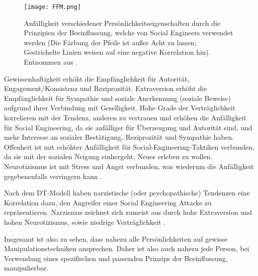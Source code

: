 \begin{figure}[!htp]
    \centering
    \texttt{[image: FFM.png]}
    \caption{Anfälligkeit verschiedener Persönlichkeitseigenschaften durch die Prinzipien der Beeinflussung, welche von Social Engineers verwendet werden (Die Färbung der Pfeile ist außer Acht zu lassen; Gestrichelte Linien weisen auf eine negative Korrelation hin). Entnommen aus .}
\end{figure}
\FloatBarrier

Gewissenhaftigkeit erhöht die Empfänglichkeit für Autorität, Engagement/Konsistenz und Reziprozität.
Extraversion erhöht die Empfänglichkeit für Sympathie und soziale Anerkennung (soziale Beweise) aufgrund ihrer Verbindung mit Geselligkeit.
Hohe Grade der Verträglichkeit korrelieren mit der Tendenz, anderen zu vertrauen und erhöhen die Anfälligkeit für Social Engineering, da sie anfälliger für Überzeugung und Autorität sind,
und mehr Interesse an sozialer Bestätigung, Reziprozität und Sympathie haben.
Offenheit ist mit erhöhter Anfälligkeit für Social-Engineering-Taktiken verbunden, da sie mit der sozialen Neigung einhergeht, Neues erleben zu wollen.
Neurotizismus ist mit Stress und Angst verbunden, was wiederum die Anfälligkeit gegebenenfalls verringern kann .

Nach dem DT-Modell haben narzistische (oder psychopathische) Tendenzen eine Korrelation dazu, den Angreifer einer Social Engineering Attacke zu repräsentieren.
Narzismus zeichnet sich zumeist aus durch hohe Extraversion und hohen Neurotizismus, sowie niedrige Verträglichkeit .

Insgesamt ist also zu sehen, dass nahezu alle Persönlichkeiten auf gewisse Manipulationstechniken ansprechen.
Daher ist also auch nahezu jede Person, bei Verwendung eines spezifischen und passenden Prinzips der Beeinflussung, manipulierbar.

